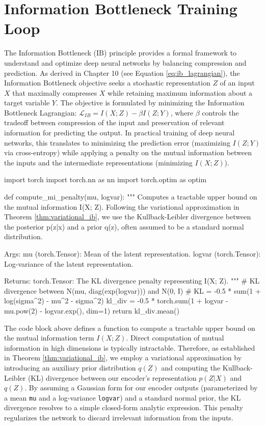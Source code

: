 \chapter{Information Bottleneck Training Loop}
\label{ch:ib_loop}

The Information Bottleneck (IB) principle provides a formal framework to understand and optimize deep neural networks by balancing compression and prediction. As derived in Chapter 10 (see Equation \ref{eq:ib_lagrangian}), the Information Bottleneck objective seeks a stochastic representation $Z$ of an input $X$ that maximally compresses $X$ while retaining maximum information about a target variable $Y$. The objective is formulated by minimizing the Information Bottleneck Lagrangian: $\mathcal{L}_{IB} = I(X; Z) - \beta I(Z; Y)$, where $\beta$ controls the tradeoff between compression of the input and preservation of relevant information for predicting the output. In practical training of deep neural networks, this translates to minimizing the prediction error (maximizing $I(Z; Y)$ via cross-entropy) while applying a penalty on the mutual information between the inputs and the intermediate representations (minimizing $I(X; Z)$). 

\begin{pycode}
import torch
import torch.nn as nn
import torch.optim as optim

def compute_mi_penalty(mu, logvar):
    """
    Computes a tractable upper bound on the mutual information I(X; Z).
    Following the variational approximation in Theorem \ref{thm:variational_ib},
    we use the Kullback-Leibler divergence between the posterior p(z|x) 
    and a prior q(z), often assumed to be a standard normal distribution.
    
    Args:
        mu (torch.Tensor): Mean of the latent representation.
        logvar (torch.Tensor): Log-variance of the latent representation.
        
    Returns:
        torch.Tensor: The KL divergence penalty representing I(X; Z).
    """
    # KL divergence between N(mu, diag(exp(logvar))) and N(0, I)
    # KL = -0.5 * sum(1 + log(sigma^2) - mu^2 - sigma^2)
    kl_div = -0.5 * torch.sum(1 + logvar - mu.pow(2) - logvar.exp(), dim=1)
    return kl_div.mean()
\end{pycode}

The code block above defines a function to compute a tractable upper bound on the mutual information term $I(X; Z)$. Direct computation of mutual information in high dimensions is typically intractable. Therefore, as established in Theorem \ref{thm:variational_ib}, we employ a variational approximation by introducing an auxiliary prior distribution $q(Z)$ and computing the Kullback-Leibler (KL) divergence between our encoder's representation $p(Z|X)$ and $q(Z)$. By assuming a Gaussian form for our encoder outputs (parameterized by a mean \texttt{mu} and a log-variance \texttt{logvar}) and a standard normal prior, the KL divergence resolves to a simple closed-form analytic expression. This penalty regularizes the network to discard irrelevant information from the inputs.

